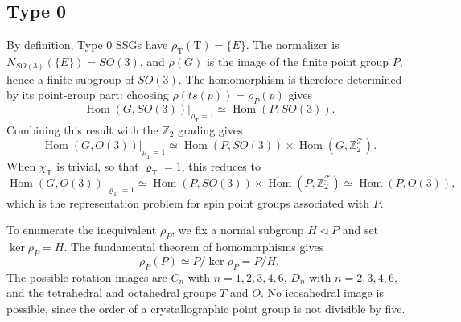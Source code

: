 \setcounter{section}{2}
\setcounter{subsection}{3}
\setcounter{equation}{8}
\begingroup
\providecommand{\theHequation}{\arabic{equation}}
\renewcommand{\theHequation}{algmerge.\arabic{equation}}

\subsection{Type 0}
\label{algmerge:type0}

By definition, Type 0 SSGs have $\rho_{\mathrm T}(\mathrm T)=\{E\}$.
The normalizer is $N_{SO(3)}(\{E\})=SO(3)$, and $\rho(G)$ is the
image of the finite point group $P$, hence a finite subgroup of $SO(3)$.
The homomorphism is therefore determined by its point-group part:
choosing $\rho(t s(p))=\rho_P(p)$ gives
\begin{equation}
 \left.\operatorname{Hom}(G,SO(3))\right|_{\rho_{\mathrm T}=1}
 \simeq\operatorname{Hom}(P,SO(3)).
 \tag{9}\label{algmerge:type0hom}
\end{equation}
Combining this result with the $\mathbb Z_2$ grading gives
\begin{equation}
 \left.\operatorname{Hom}(G,O(3))\right|_{\rho_{\mathrm T}=1}
 \simeq\operatorname{Hom}(P,SO(3))\times
 \operatorname{Hom}(G,\mathbb Z_2^{\mathcal T}).
 \tag{10}\label{algmerge:type0graded}
\end{equation}
When $\chi_{\mathrm T}$ is trivial, so that $\varrho_{\mathrm T}=1$,
this reduces to
\begin{equation}
 \left.\operatorname{Hom}(G,O(3))\right|_{\varrho_{\mathrm T}=1}
 \simeq\operatorname{Hom}(P,SO(3))\times
 \operatorname{Hom}(P,\mathbb Z_2^{\mathcal T})
 \simeq\operatorname{Hom}(P,O(3)),
 \tag{11}\label{algmerge:spinpoint}
\end{equation}
which is the representation problem for spin point groups associated
with $P$.

To enumerate the inequivalent $\rho_P$, we fix a normal subgroup
$H\lhd P$ and set $\ker\rho_P=H$. The fundamental theorem of
homomorphisms gives
\begin{equation}
 \rho_P(P)\simeq P/\ker\rho_P=P/H.
 \tag{12}\label{algmerge:quotient}
\end{equation}
The possible rotation images are $C_n$ with $n=1,2,3,4,6$,
$D_n$ with $n=2,3,4,6$, and the tetrahedral and octahedral groups
$T$ and $O$. No icosahedral image is possible, since the order of a
crystallographic point group is not divisible by five.

